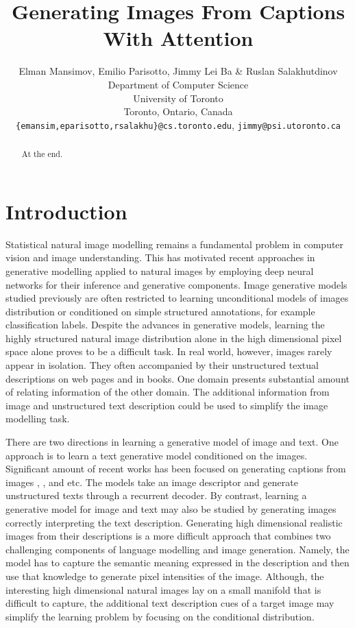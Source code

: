 \documentclass{article} %
\title{Generating Images From Captions\\ With Attention}
\author{
Elman Mansimov, Emilio Parisotto, Jimmy Lei Ba \& Ruslan Salakhutdinov\\
Department of Computer Science\\
University of Toronto\\
Toronto, Ontario, Canada \\
\texttt{\{emansim,eparisotto,rsalakhu\}@cs.toronto.edu}, \texttt{jimmy@psi.utoronto.ca}
}
\begin{document}
\maketitle

\begin{abstract}
At the end.
\end{abstract}

\section{Introduction}

Statistical natural image modelling remains a fundamental problem in computer vision and image understanding. This has motivated recent approaches in generative modelling applied to natural images by employing deep neural networks for their inference and generative components. Image generative models studied previously are often restricted to learning unconditional models of images distribution or conditioned on simple structured annotations, for example classification labels. Despite the advances in generative models, learning the highly structured natural image distribution alone in the high dimensional pixel space alone proves to be a difficult task. In real world, however, images rarely appear in isolation. They often accompanied by their unstructured textual descriptions on web pages and in books. One domain presents substantial amount of relating information of the other domain. The additional information from image and unstructured text description could be used to simplify the image modelling task.

There are two directions in learning a generative model of image and text.  One approach is to learn a text generative model conditioned on the images. Significant amount of recent works has been focused on generating captions from images \citep{karpathy_captions}, \citep{xu_captions}, \citep{kiros_captions} and etc. The models take an image descriptor and generate unstructured texts through a recurrent decoder. By contrast, learning a generative model for image and text may also be studied by generating images correctly interpreting the text description. 
Generating high dimensional realistic images from their descriptions is a more difficult approach that combines two challenging components of language modelling and image generation. Namely, the model has to capture the semantic meaning expressed in the description and then use that knowledge to generate pixel intensities of the image. Although, the interesting high dimensional natural images lay on a small manifold that is difficult to capture, the additional text description cues of a target image may simplify the learning problem by focusing on the conditional distribution.   
\end{document}
